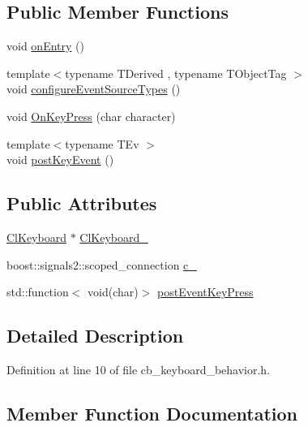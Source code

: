 \subsection*{Public Member Functions}
\begin{DoxyCompactItemize}
\item 
void \hyperlink{classsm__three__some_1_1CbKeyboard_af5fe2932db5f471afa125cae35362ba7}{on\+Entry} ()
\item 
{\footnotesize template$<$typename T\+Derived , typename T\+Object\+Tag $>$ }\\void \hyperlink{classsm__three__some_1_1CbKeyboard_a868ad517e8faf2408391f9607e5de33c}{configure\+Event\+Source\+Types} ()
\item 
void \hyperlink{classsm__three__some_1_1CbKeyboard_a28bdbe8a69cabc44933f601061331cbf}{On\+Key\+Press} (char character)
\item 
{\footnotesize template$<$typename T\+Ev $>$ }\\void \hyperlink{classsm__three__some_1_1CbKeyboard_a02cbcf0db3b509c78b545e9f1d3ef313}{post\+Key\+Event} ()
\end{DoxyCompactItemize}
\subsection*{Public Attributes}
\begin{DoxyCompactItemize}
\item 
\hyperlink{classsm__three__some_1_1ClKeyboard}{Cl\+Keyboard} $\ast$ \hyperlink{classsm__three__some_1_1CbKeyboard_adbbfdbe9e4dc267a55e85f19683131fc}{Cl\+Keyboard\+\_\+}
\item 
boost\+::signals2\+::scoped\+\_\+connection \hyperlink{classsm__three__some_1_1CbKeyboard_a6b6a885c39f32f29e907cfbc37b08b6f}{c\+\_\+}
\item 
std\+::function$<$ void(char)$>$ \hyperlink{classsm__three__some_1_1CbKeyboard_a746c413234e920c55625d63f4a6be784}{post\+Event\+Key\+Press}
\end{DoxyCompactItemize}


\subsection{Detailed Description}


Definition at line 10 of file cb\+\_\+keyboard\+\_\+behavior.\+h.



\subsection{Member Function Documentation}
